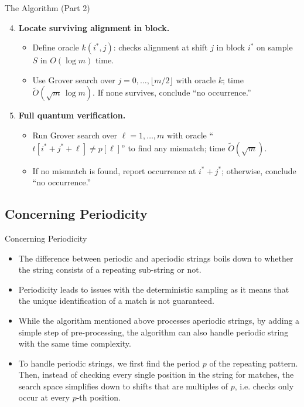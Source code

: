 \documentclass{beamer}
\begin{document}
\begin{frame}{The Algorithm (Part 2)}
    \begin{enumerate}
        \setcounter{enumi}{3}
        \item \textbf{Locate surviving alignment in block.}
              \begin{itemize}
                  \item Define oracle \(k(i^*,j)\): checks alignment at shift \(j\) in block \(i^*\) on sample \(S\) in \(O(\log m)\) time.
                  \item Use Grover search over \(j=0,\dots,\lfloor m/2\rfloor\) with oracle \(k\); time \(\widetilde O(\sqrt{m}\,\log m)\). If none survives, conclude “no occurrence.”
              \end{itemize}
        \item \textbf{Full quantum verification.}
              \begin{itemize}
                  \item Run Grover search over \(\ell=1,\dots,m\) with oracle “\(t[i^*+j^*+\ell]\neq p[\ell]\)” to find any mismatch; time \(\widetilde O(\sqrt{m})\).
                  \item If no mismatch is found, report occurrence at \(i^*+j^*\); otherwise, conclude “no occurrence.”
              \end{itemize}
    \end{enumerate}
\end{frame}

\subsection{Concerning Periodicity}
\begin{frame}{Concerning Periodicity}
    \begin{itemize}
        \item The difference between periodic and aperiodic strings boils down to whether the string consists of a repeating sub-string or not. 
		\item Periodicity leads to issues with the deterministic sampling as it means that the unique identification of a match is not guaranteed.
        \item While the algorithm mentioned above processes aperiodic strings, by adding a simple step of pre-processing, the algorithm can also handle periodic string with the same time complexity.
        
        \item To handle periodic strings, we first find the period $p$ of the repeating pattern. Then, instead of checking every single position in the string for matches, the search space simplifies down to shifts that are multiples of $p$, i.e. checks only occur at every $p$-th position.
    \end{itemize}
\end{frame}
\end{document}
